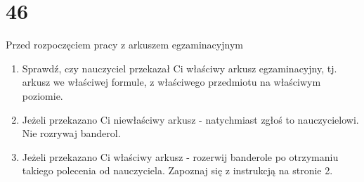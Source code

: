 \documentclass[10pt]{article}
\begin{document}
\section*{46}
Przed rozpoczęciem pracy z arkuszem egzaminacyjnym

\begin{enumerate}
  \item Sprawdź, czy nauczyciel przekazał Ci właściwy arkusz egzaminacyjny, tj. arkusz we właściwej formule, z właściwego przedmiotu na właściwym poziomie.
  \item Jeżeli przekazano Ci niewłaściwy arkusz - natychmiast zgłoś to nauczycielowi. Nie rozrywaj banderol.
  \item Jeżeli przekazano Ci właściwy arkusz - rozerwij banderole po otrzymaniu takiego polecenia od nauczyciela. Zapoznaj się z instrukcją na stronie 2.
\end{enumerate}
\end{document}
